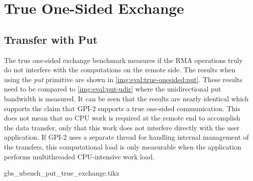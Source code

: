 \section{True One-Sided Exchange}

\subsection{Transfer with Put}

The true one-sided exchange benchmark measures if the \ac{RMA} operations truly do not interfere with the computations on the remote side. The results when using the \emph{put} primitive are shown in \autoref{img:eval:true-onesided:put}. These results need to be compared to \autoref{img:eval:put-udir} where the unidirectional put bandwidth is measured. It can be seen that the results are nearly identical which supports the claim that \ac{GPI}-2 supports a true one-sided communication. This does not mean that no \ac{CPU} work is required at the remote end to accomplish the data transfer, only that this work does not interfere directly with the user application. If \ac{GPI}-2 uses a separate thread for handling internal management of the transfers, this computational load is only measurable when the application performs multithreaded \ac{CPU}-intensive work load.


\newcommand{\plottrueput}{gbs_ubench_put_true_exchange.tikz}
\begin{filecontents}{\plottrueput}

\newcommand{\csv}{gbs_ubench_put_true_exchange.csv}
\newcommand{\csvgi}{result-gi/\csv}
\newcommand{\csvte}{result-te/\csv}
\newcommand{\csvipoib}{result-ipoib/\csv}
\newcommand{\csvib}{result-ib/\csv}

\end{filecontents}

